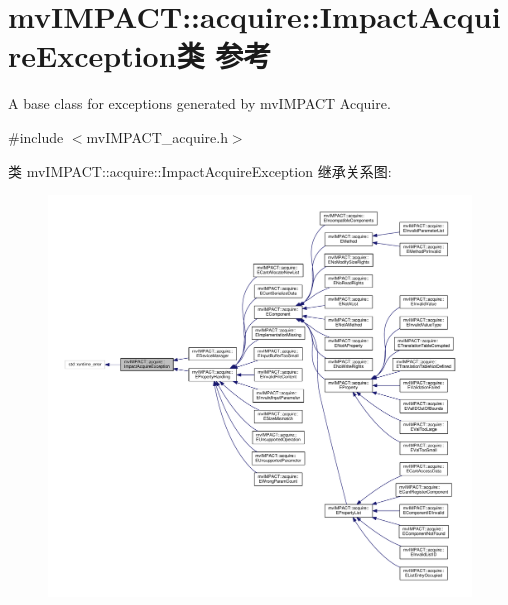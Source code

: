 \hypertarget{classmv_i_m_p_a_c_t_1_1acquire_1_1_impact_acquire_exception}{\section{mv\+I\+M\+P\+A\+C\+T\+:\+:acquire\+:\+:Impact\+Acquire\+Exception类 参考}
\label{classmv_i_m_p_a_c_t_1_1acquire_1_1_impact_acquire_exception}
}


A base class for exceptions generated by mv\+I\+M\+P\+A\+C\+T Acquire.  




{\ttfamily \#include $<$mv\+I\+M\+P\+A\+C\+T\+\_\+acquire.\+h$>$}



类 mv\+I\+M\+P\+A\+C\+T\+:\+:acquire\+:\+:Impact\+Acquire\+Exception 继承关系图\+:
\nopagebreak
\begin{figure}[H]
\begin{center}
\leavevmode
\includegraphics[width=350pt]{classmv_i_m_p_a_c_t_1_1acquire_1_1_impact_acquire_exception__inherit__graph}
\end{center}
\end{figure}


